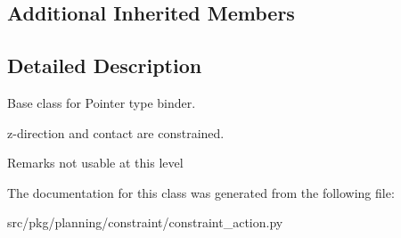 \subsection*{Additional Inherited Members}


\subsection{Detailed Description}
Base class for Pointer type binder. 

z-\/direction and contact are constrained. \begin{DoxyRemark}{Remarks}
not usable at this level 
\end{DoxyRemark}


The documentation for this class was generated from the following file\+:\begin{DoxyCompactItemize}
\item 
src/pkg/planning/constraint/constraint\+\_\+action.\+py\end{DoxyCompactItemize}
